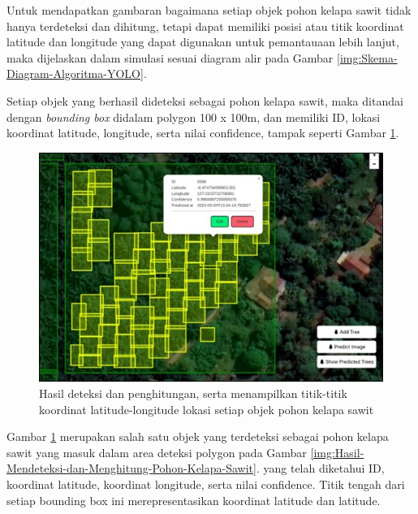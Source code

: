 Untuk mendapatkan gambaran bagaimana setiap objek pohon kelapa sawit tidak hanya terdeteksi dan dihitung, tetapi dapat memiliki posisi atau titik koordinat latitude dan longitude yang dapat digunakan untuk pemantauaan lebih lanjut, maka dijelaskan dalam simulasi sesuai diagram alir pada Gambar \ref{img:Skema-Diagram-Algoritma-YOLO}.

Setiap objek yang berhasil dideteksi sebagai pohon kelapa sawit, maka ditandai dengan \textit{bounding box} didalam polygon 100 x 100m, dan memiliki ID, lokasi koordinat latitude, longitude, serta nilai confidence, tampak seperti Gambar \ref{img:Hasil-Deteksi-dan-Penghitungan-Serta-Menampilkan-Titik-Titik}.

\begin{figure}[H]
	\vspace{-0.1cm}
	\begin{center}
		\includegraphics[width=1\columnwidth]{bab4/Gambar/Picture38.jpg}
	\end{center}
	\vspace{-0.2cm}
	\captionsetup{justification=centering}
	\caption{Hasil deteksi dan penghitungan, serta menampilkan titik-titik koordinat latitude-longitude lokasi setiap objek pohon kelapa sawit}\label{img:Hasil-Deteksi-dan-Penghitungan-Serta-Menampilkan-Titik-Titik}
\end{figure}

Gambar \ref{img:Hasil-Deteksi-dan-Penghitungan-Serta-Menampilkan-Titik-Titik} merupakan salah satu objek yang terdeteksi sebagai pohon kelapa sawit yang masuk dalam area deteksi polygon pada Gambar \ref{img:Hasil-Mendeteksi-dan-Menghitung-Pohon-Kelapa-Sawit}. yang telah diketahui ID, koordinat latitude, koordinat longitude, serta nilai confidence. Titik tengah dari setiap bounding box ini merepresentasikan koordinat latitude dan latitude.

